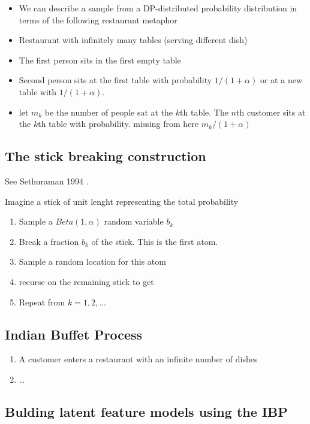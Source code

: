 \begin{itemize}
  \item We can describe a sample from a DP-distributed probability distribution
    in terms of the following restaurant metaphor
  \item Restaurant with infinitely many tables (serving different dish)
  \item The first person sits in the first empty table
  \item Second person sits at the first table with probability $1/(1+\alpha)$ or
    at a new table with $1/(1+\alpha)$.
  \item let $m_k$ be the number of people sat at the $k$th table. The $n$th
    customer sits at the $k$th table with probability. missing from here $m_k/(1 + \alpha)$

\end{itemize}

\subsection{The stick breaking construction}

See Sethuraman 1994 \cite{sethuraman1994constructive}.

Imagine a stick of unit lenght representing the total probability

\begin{enumerate}
  \item Sample a $Beta(1, \alpha)$ random variable $b_k$
  \item Break a fraction $b_k$ of the stick. This is the first atom.
  \item Sample a random location for this atom
  \item recurse on the remaining stick to get
  \item Repeat from $k = 1,2,\dots$
\end{enumerate}

\subsection{Indian Buffet Process}

\begin{enumerate}
  \item A customer enters a restaurant with an infinite number of dishes
  \item \dots
\end{enumerate}

\subsection{Bulding latent feature models using the IBP}

